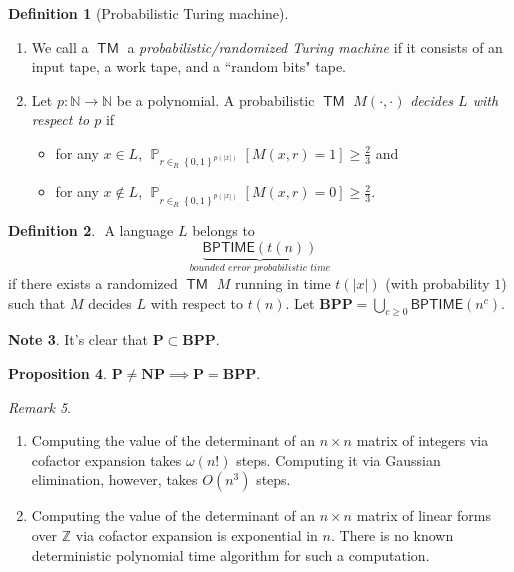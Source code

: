 \documentclass[10pt,letterpaper,cm]{nupset}
\theoremstyle{definition}
\newtheorem{definition}{Definition}[subsection]
\newtheorem{note}[definition]{Note}
\theoremstyle{theorem}
\newtheorem{prop}[definition]{Proposition}
\theoremstyle{remark}
\newtheorem{remark}[definition]{Remark}
\newcommand{\N}{\mathbb N}
\newcommand{\Z}{\mathbb Z}
\newcommand{\1}{\mathbf{1}}
\newcommand{\0}{\vec 0}
\DeclareMathOperator{\pr}{\mathbb{P}}
\DeclareMathOperator{\TM}{\mathsf{TM}}
\begin{document}
\begin{definition}[Probabilistic Turing machine] $ $
\begin{enumerate}
\item We call a $\TM$ a \textit{probabilistic/randomized Turing machine} if it consists of an input tape, a work tape, and a ``random bits" tape.  
\item Let $p: \N \to \N$ be a polynomial. A probabilistic $\TM$ $M({\cdot}, {\cdot})$ \textit{decides $L$ with respect to $p$} if 
\begin{itemize}
\item for any $x\in L$, $\pr_{r\in_R \left\{0,1\right\}^{p(\left\lvert{x}\right\rvert)}}\left[M(x,r)=1\right] \geq \frac{2}{3}$ and
\item for any $x\notin L$, $\pr_{r\in_R \left\{0,1\right\}^{p(\left\lvert{x}\right\rvert)}}\left[M(x,r)=0\right] \geq \frac{2}{3}$.
\end{itemize}
\end{enumerate}
\end{definition}

\begin{definition} $ $
A language $L$ belongs to $$\underbrace{\mathsf{BPTIME}(t(n))}_{\textit{bounded error probabilistic time}}$$ if there exists a randomized $\TM$ $M$ running in time $t(\left\lvert{x}\right\rvert)$ (with probability $1$) such that $M$ decides $L$ with respect to $t(n)$. Let $\mathbf{BPP}= \bigcup_{c\geq 0} \mathsf{BPTIME}(n^c)$.
\end{definition}

\begin{note}
It's clear that $\mathbf{P} \subset \mathbf{BPP}$.
\end{note}

\begin{prop}
$\mathbf{P} \ne \mathbf{NP} \implies \mathbf{P} = \mathbf{BPP}$.
\end{prop}

\bigskip

\begin{remark} $ $
\begin{enumerate}
\item Computing the value of the determinant of an $n\times n$ matrix of integers via cofactor expansion takes $\omega(n!)$ steps. Computing it via Gaussian elimination, however, takes $O(n^3)$ steps. 
\item Computing the value of the determinant of an $n\times n$ matrix of linear forms over $\Z$ via cofactor expansion is exponential in $n$. There is no known deterministic polynomial time algorithm for such a computation.
\end{enumerate}
\end{remark}
\end{document}
